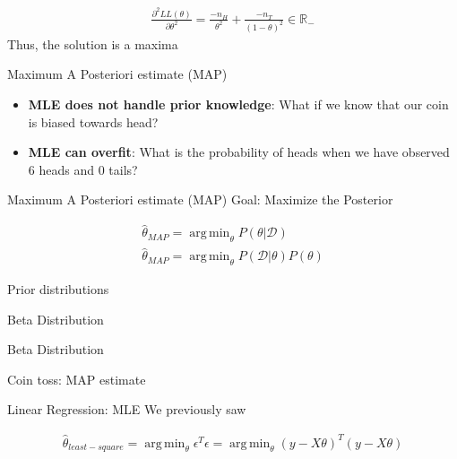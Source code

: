 \documentclass{beamer}
\newcommand{\data}{\mathcal{D}}
\DeclareMathOperator*{\argmin}{arg\,min}
\begin{document}
\begin{frame}{}
\begin{align*}
\frac{\partial^2 LL(\theta)}{\partial \theta^2} = \frac{-n_H}{\theta^2} + \frac{-n_T}{(1-\theta)^2} \in \mathbb R_-
\end{align*}
Thus, the solution is a maxima
\end{frame}

\begin{frame}{Maximum A Posteriori estimate (MAP)}
\begin{itemize}


\item \textbf{MLE does not handle prior knowledge}: What if we know that our coin is biased towards head?
\item \textbf{MLE can overfit}: What is the probability of heads when we have observed 6 heads and 0 tails?
\end{itemize}

\end{frame}


\begin{frame}{Maximum A Posteriori estimate (MAP)}
Goal: Maximize the Posterior
\begin{tcolorbox}
	\begin{align}
\hat{\theta}_{MAP} = \argmin_\theta P(\theta|\data)\\
\hat{\theta}_{MAP}= \argmin_\theta P(\data|\theta)P(\theta)
\end{align}
\end{tcolorbox}

\end{frame}

\begin{frame}{Prior distributions}
\end{frame}

\begin{frame}{Beta Distribution}
\end{frame}

\begin{frame}{Beta Distribution}
\end{frame}

\begin{frame}{Coin toss: MAP estimate}
\end{frame}

\begin{frame}{Linear Regression: MLE}
We previously saw 
\begin{tcolorbox}
\begin{align*}
\hat{\theta}_{least-square} = \argmin_\theta \epsilon^T\epsilon = \argmin_\theta (y-X\theta)^T(y-X\theta)
\end{align*}
\end{tcolorbox}


\end{frame}
\end{document}
